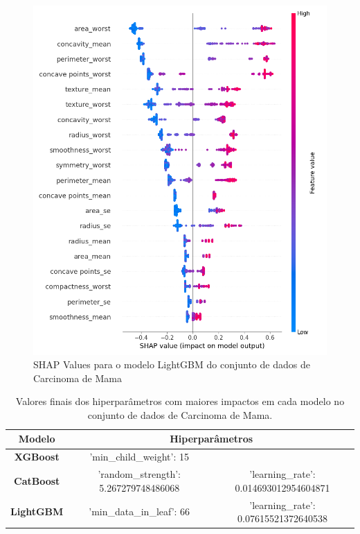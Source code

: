 \begin{figure}[H]
 \caption{SHAP Values para o modelo LightGBM do conjunto de dados de Carcinoma de Mama}
 \label{shap:fin:canc}
 \centering
 \includegraphics[scale=0.5]{images/shap_cancer.png}
\end{figure}

\begin{table}[H]
\centering
\begin{tabular}{|c|c|c|}
\hline
\textbf{Modelo} & \multicolumn{2}{c|}{\textbf{Hiperparâmetros}} \\
\hline
\textbf{XGBoost} & 'min\_child\_weight': 15 & \\
\hline
\textbf{CatBoost} &'random\_strength': 5.267279748486068 & 'learning\_rate': 0.014693012954604871\\
\hline
\textbf{LightGBM} & 'min\_data\_in\_leaf': 66 & 'learning\_rate': 0.07615521372640538 \\
\hline
\end{tabular}
\caption{Valores finais dos hiperparâmetros com maiores impactos em cada modelo no conjunto de dados de Carcinoma de Mama.}
\end{table}

